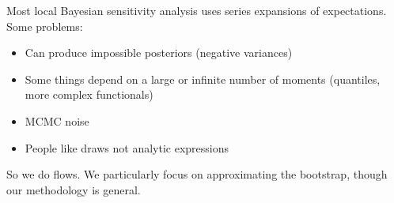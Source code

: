 Most local Bayesian sensitivity analysis uses series expansions of
expectations.  Some problems:
%
\begin{itemize}
\item Can produce impossible posteriors (negative variances)
\item Some things depend on a large or infinite number of moments (quantiles, more complex functionals)
\item MCMC noise
\item People like draws not analytic expressions
\end{itemize}
%
So we do flows.  We particularly focus on approximating the bootstrap, though our methodology is
general.